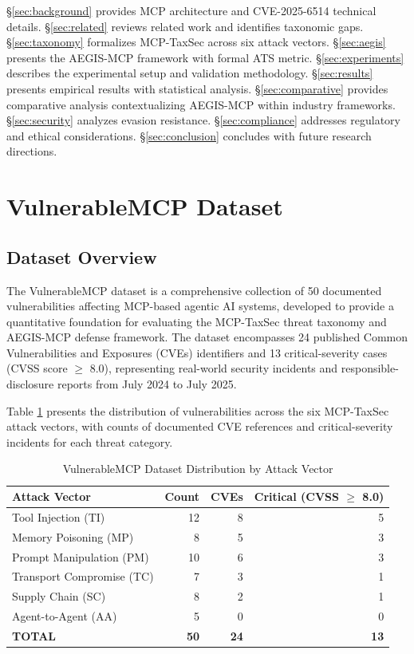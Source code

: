 \documentclass[12pt,twocolumn,journal]{IEEEtran}
\begin{document}
\S\ref{sec:background} provides MCP architecture and CVE-2025-6514 technical details. \S\ref{sec:related} reviews related work and identifies taxonomic gaps. \S\ref{sec:taxonomy} formalizes MCP-TaxSec across six attack vectors. \S\ref{sec:aegis} presents the AEGIS-MCP framework with formal ATS metric. \S\ref{sec:experiments} describes the experimental setup and validation methodology. \S\ref{sec:results} presents empirical results with statistical analysis. \S\ref{sec:comparative} provides comparative analysis contextualizing AEGIS-MCP within industry frameworks. \S\ref{sec:security} analyzes evasion resistance. \S\ref{sec:compliance} addresses regulatory and ethical considerations. \S\ref{sec:conclusion} concludes with future research directions.

\section{VulnerableMCP Dataset}
\label{sec:dataset}

\subsection{Dataset Overview}

The VulnerableMCP dataset is a comprehensive collection of 50 documented vulnerabilities affecting MCP-based agentic AI systems, developed to provide a quantitative foundation for evaluating the MCP-TaxSec threat taxonomy and AEGIS-MCP defense framework. The dataset encompasses 24 published Common Vulnerabilities and Exposures (CVEs) identifiers and 13 critical-severity cases (CVSS score $\geq$ 8.0), representing real-world security incidents and responsible-disclosure reports from July 2024 to July 2025.

Table \ref{tab:vulnerable_mcp_dist} presents the distribution of vulnerabilities across the six MCP-TaxSec attack vectors, with counts of documented CVE references and critical-severity incidents for each threat category.

\begin{table}[!t]
\centering
\caption{VulnerableMCP Dataset Distribution by Attack Vector}
\label{tab:vulnerable_mcp_dist}
\small
\begin{tabular}{p{2.5cm}|r|r|r}
\toprule
\textbf{Attack Vector} & \textbf{Count} & \textbf{CVEs} & \textbf{Critical (CVSS $\geq$ 8.0)} \\
\midrule
Tool Injection (TI) & 12 & 8 & 5 \\
Memory Poisoning (MP) & 8 & 5 & 3 \\
Prompt Manipulation (PM) & 10 & 6 & 3 \\
Transport Compromise (TC) & 7 & 3 & 1 \\
Supply Chain (SC) & 8 & 2 & 1 \\
Agent-to-Agent (AA) & 5 & 0 & 0 \\
\midrule
\textbf{TOTAL} & \textbf{50} & \textbf{24} & \textbf{13} \\
\bottomrule
\end{tabular}
\end{table}
\end{document}
